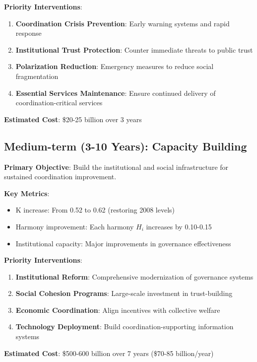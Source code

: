 \documentclass[12pt,letterpaper]{article}
\begin{document}
\textbf{Priority Interventions}:

\begin{enumerate}
    \item \textbf{Coordination Crisis Prevention}: Early warning systems and rapid response
    \item \textbf{Institutional Trust Protection}: Counter immediate threats to public trust
    \item \textbf{Polarization Reduction}: Emergency measures to reduce social fragmentation
    \item \textbf{Essential Services Maintenance}: Ensure continued delivery of coordination-critical services
\end{enumerate}

\textbf{Estimated Cost}: \$20-25 billion over 3 years

\subsection{Medium-term (3-10 Years): Capacity Building}

\textbf{Primary Objective}: Build the institutional and social infrastructure for sustained coordination improvement.

\textbf{Key Metrics}:
\begin{itemize}
    \item K increase: From 0.52 to 0.62 (restoring 2008 levels)
    \item Harmony improvement: Each harmony $H_i$ increases by 0.10-0.15
    \item Institutional capacity: Major improvements in governance effectiveness
\end{itemize}

\textbf{Priority Interventions}:

\begin{enumerate}
    \item \textbf{Institutional Reform}: Comprehensive modernization of governance systems
    \item \textbf{Social Cohesion Programs}: Large-scale investment in trust-building
    \item \textbf{Economic Coordination}: Align incentives with collective welfare
    \item \textbf{Technology Deployment}: Build coordination-supporting information systems
\end{enumerate}

\textbf{Estimated Cost}: \$500-600 billion over 7 years (\$70-85 billion/year)
\end{document}
